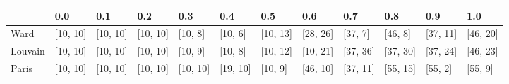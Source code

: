 \begin{tabular}{llllllllllll}
\toprule
{} &       0.0 &       0.1 &       0.2 &       0.3 &       0.4 &       0.5 &       0.6 &       0.7 &       0.8 &       0.9 &       1.0 \\
\midrule
Ward    &  [10, 10] &  [10, 10] &  [10, 10] &   [10, 8] &   [10, 6] &  [10, 13] &  [28, 26] &   [37, 7] &   [46, 8] &  [37, 11] &  [46, 20] \\
Louvain &  [10, 10] &  [10, 10] &  [10, 10] &   [10, 9] &   [10, 8] &  [10, 12] &  [10, 21] &  [37, 36] &  [37, 30] &  [37, 24] &  [46, 23] \\
Paris   &  [10, 10] &  [10, 10] &  [10, 10] &  [10, 10] &  [19, 10] &   [10, 9] &  [46, 10] &  [37, 11] &  [55, 15] &   [55, 2] &   [55, 9] \\
\bottomrule
\end{tabular}
